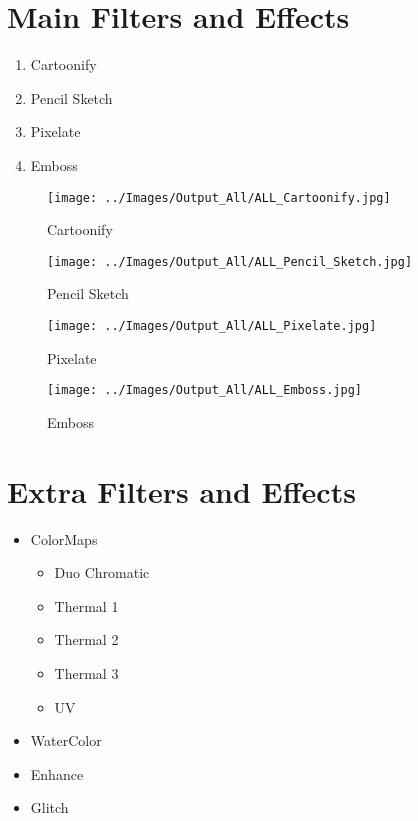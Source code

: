 \chapter{Main Filters and Effects}
\label{MainEffects}

\begin{enumerate}
	\item Cartoonify
	\item Pencil Sketch
	\item Pixelate
	\item Emboss
\end{enumerate}


\begin{figure}[h]
	\caption{Cartoonify}
	\centering
	\texttt{[image: ../Images/Output\_All/ALL\_Cartoonify.jpg]}
	\label{ALLCartoonify}
\end{figure}


\begin{figure}[h]
	\caption{Pencil Sketch}
	\centering
	\texttt{[image: ../Images/Output\_All/ALL\_Pencil\_Sketch.jpg]}
	\label{ALLPencilSKetch}
\end{figure}


\begin{figure}[h]
	\caption{Pixelate}
	\centering
	\texttt{[image: ../Images/Output\_All/ALL\_Pixelate.jpg]}
	\label{ALLPixelate}
\end{figure}

\begin{figure}[h]
	\caption{Emboss}
	\centering
	\texttt{[image: ../Images/Output\_All/ALL\_Emboss.jpg]}
	\label{ALLEmboss}
\end{figure}





\chapter{Extra Filters and Effects}
\label{ExtraEffects}

\begin{itemize}
	\item ColorMaps
	\begin{itemize}
		\item Duo Chromatic
		\item Thermal 1
		\item Thermal 2
		\item Thermal 3
		\item UV
	\end{itemize}
	\item WaterColor
	\item Enhance
	\item Glitch
\end{itemize}

